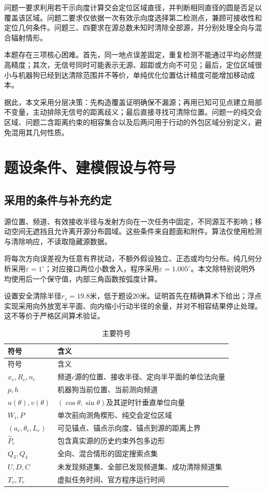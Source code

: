 \documentclass[UTF8,a4paper,zihao=-4,fontset=windows]{ctexart}
\begin{document}
问题一要求利用若干示向度计算交会定位区域直径，并判断相同直径的圆是否足以覆盖该区域。问题二要求仅依据一次有效示向度选择第二检测点，兼顾可接收性和定位几何条件。问题三、四要求在源总数未知时清除全部源，并分别处理全向与混合辐射情形。

本题存在三项核心困难。首先，同一地点误差固定，重复检测不能通过平均必然提高精度；其次，无信号同时可能表示无源、超距或方向不可见；最后，定位区域很小与机器狗已经到达清除范围并不等价，单纯优化位置估计精度可能增加移动成本。

据此，本文采用分层决策：先构造覆盖证明确保不漏源；再用已知可见点建立局部不变量，主动排除无信号的距离歧义；最后直接寻找可清除位置。问题一的纯交会区域、问题二含距离约束的相容集合以及后两问用于行动的外包区域分别定义，避免混用其几何性质。

\section{题设条件、建模假设与符号}
\subsection{采用的条件与补充约定}
源位置、频道、有效接收半径与发射方向在一次任务中固定，不同源互不影响；移动空间无遮挡且允许离开源分布圆域。这些条件来自题面和附件。算法仅使用检测与清除响应，不读取隐藏源数据。

将每次方向误差视为任意有界扰动，不额外假设独立、正态或均匀分布。纯几何分析采用$\varepsilon=1^\circ$；对应接口两位小数舍入，程序采用$\varepsilon=1.005^\circ$。本文除特别说明外均使用后一个保守值，内部三角函数按弧度计算。

设置安全清除半径$r_s=19.8$米，低于题设20米。证明首先在精确算术下给出；浮点实现采用向外放宽半平面、向内缩小行动半径的余量，并对不相容结果停止处理。这不等价于严格区间算术验证。

\begin{longtable}{p{}p{}}
\caption{主要符号}\label{tab:symbols}\\
\toprule 符号 & 含义\\\midrule\endfirsthead
\toprule 符号 & 含义\\\midrule\endhead
$x_c,R_c,n_c$ & 频道$c$源的位置、接收半径、定向半平面的单位法向量\\
$p,h$ & 机器狗当前位置、当前测向频道\\
$u(\theta),v(\theta)$ & $(\cos\theta,\sin\theta)$及其逆时针垂直单位向量\\
$W_i,P$ & 单次前向测角楔形、纯交会定位区域\\
$(a_c,\theta_c,L_c)$ & 可见锚点、锚点示向度、锚点到源的距离上界\\
$\widehat P_c$ & 包含真实源的历史约束外包多边形\\
$Q_3,Q_4$ & 全向、混合情形的固定搜索点集\\
$U,D,C$ & 未发现频道集、全部已发现频道集、成功清除频道集\\
$T_v,T_r$ & 虚拟任务时间、官方程序运行时间\\
\bottomrule
\end{longtable}
\end{document}
